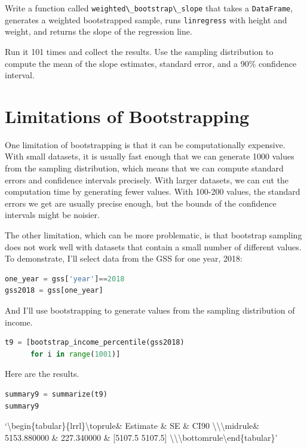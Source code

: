 Write a function called
\passthrough{\lstinline!weighted\_bootstrap\_slope!} that takes a
\passthrough{\lstinline!DataFrame!}, generates a weighted bootstrapped
sample, runs \passthrough{\lstinline!linregress!} with height and
weight, and returns the slope of the regression line.

Run it 101 times and collect the results. Use the sampling distribution
to compute the mean of the slope estimates, standard error, and a 90\%
confidence interval.

\hypertarget{limitations-of-bootstrapping}{%
\section{Limitations of
Bootstrapping}\label{limitations-of-bootstrapping}}

One limitation of bootstrapping is that it can be computationally
expensive. With small datasets, it is usually fast enough that we can
generate 1000 values from the sampling distribution, which means that we
can compute standard errors and confidence intervals precisely. With
larger datasets, we can cut the computation time by generating fewer
values. With 100-200 values, the standard errors we get are usually
precise enough, but the bounds of the confidence intervals might be
noisier.

The other limitation, which can be more problematic, is that bootstrap
sampling does not work well with datasets that contain a small number of
different values. To demonstrate, I'll select data from the GSS for one
year, 2018:

\begin{lstlisting}[language=Python,style=source]
one_year = gss['year']==2018
gss2018 = gss[one_year]
\end{lstlisting}

And I'll use bootstrapping to generate values from the sampling
distribution of income.

\begin{lstlisting}[language=Python,style=source]
t9 = [bootstrap_income_percentile(gss2018)
      for i in range(1001)]
\end{lstlisting}

Here are the results.

\begin{lstlisting}[language=Python,style=source]
summary9 = summarize(t9)
summary9
\end{lstlisting}

`\textbackslash begin\{tabular\}\{lrrl\}\n\textbackslash toprule\n \&
Estimate \& SE \& CI90
\textbackslash\textbackslash{}\n\textbackslash midrule\n \& 5153.880000
\& 227.340000 \& {[}5107.5 5107.5{]}
\textbackslash\textbackslash{}\n\textbackslash bottomrule\n\textbackslash end\{tabular\}\n'

